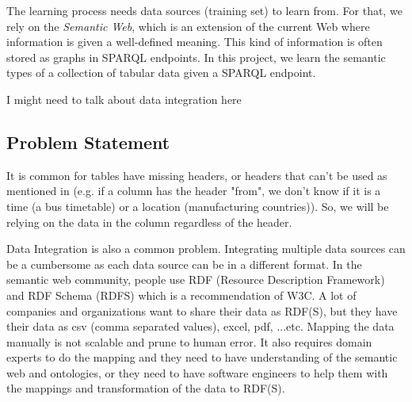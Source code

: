 \documentclass{article}
\newcommand{\comm}[2][inline]{\color{green} #2 \color{black}}
\newcommand{\crossout}[2][inline]{\color{red}\st{#2}\color{black}}
\begin{document}




The learning process needs data sources (training set) to learn from.
For that, we rely on the \textit{Semantic Web}, which is an extension of the current Web where information is given a well-defined meaning\cite{sw-easy}. This kind of information is often stored as graphs in SPARQL endpoints. %
In this project, we learn the semantic types of a collection of tabular data given a SPARQL endpoint.


\comm{I might need to talk about data integration here}








\subsection{Problem Statement}
It is common for tables have missing headers, or headers that can\rq t be used as mentioned in \cite{webtables-power-2008} (e.g. if a column has the header "from", we don\rq t know if it is a time (a bus timetable) or a location (manufacturing countries)). So, we will be relying on the data in the column regardless of the header. 

Data Integration is also a common problem. Integrating multiple data sources can be a cumbersome as each data source can be in a different format. In the semantic web community, people use RDF (Resource Description Framework) and RDF Schema (RDFS) which is a recommendation of W3C. A lot of companies and organizations want to share their data as RDF(S), but they have their data as csv (comma separated values), excel, pdf, ...etc. Mapping the data manually is not scalable and prune to human error. It also requires domain experts to do the mapping and they need to have understanding of the semantic web and ontologies, or they need to have software engineers to help them with the mappings and transformation of the data to RDF(S).
\end{document}
